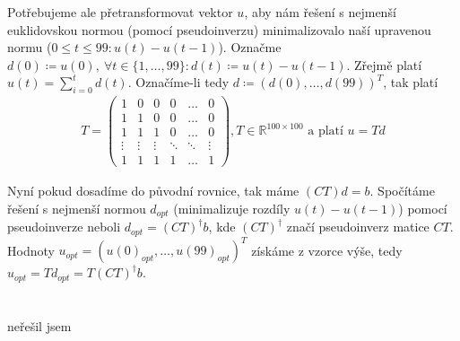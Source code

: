 \documentclass[12pt, a4paper]{article}
\begin{document}
Potřebujeme ale přetransformovat vektor $u$, aby nám řešení s nejmenší euklidovskou normou (pomocí pseudoinverzu) minimalizovalo naší upravenou normu ($0 \leq t \leq 99: u(t)-u(t-1)$). Označme $d(0)\coloneqq u(0),\ \forall t \in \{1,\dots,99\}: d(t) \coloneqq u(t)-u(t-1)$. Zřejmě platí $u(t)=\sum_{i=0}^t d(t)$. Označíme-li tedy $d \coloneqq (d(0),\dots,d(99))^T$, tak platí
\begin{gather*}
T = \begin{pmatrix}
1 & 0 & 0 & 0 & \dots & 0\\
1 & 1 & 0 & 0 & \dots & 0\\
1 & 1 & 1 & 0 & \dots & 0\\
\vdots & \vdots & \vdots & \ddots &\ddots & \vdots\\
1 & 1 & 1 & 1 & \dots & 1
\end{pmatrix}, T \in \mathbb{R}^{100 \times 100} \text{ a platí } u = Td
\end{gather*}

Nyní pokud dosadíme do původní rovnice, tak máme $(CT)d=b$. Spočítáme řešení s nejmenší normou $d_{opt}$ (minimalizuje rozdíly $u(t)-u(t-1)$) pomocí pseudoinverze neboli $d_{opt} = (CT)^{\dagger}b $, kde $(CT)^{\dagger}$ značí pseudoinverz matice $CT$. Hodnoty $u_{opt}=(u(0)_{opt},\dots,u(99)_{opt})^T$ získáme z vzorce výše, tedy $u_{opt}=Td_{opt} = T(CT)^{\dagger}b$.

\section{}
neřešil jsem
\end{document}
